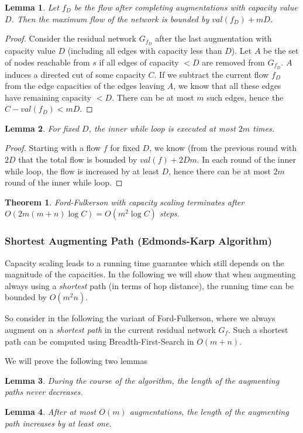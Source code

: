 \documentclass{article}
\newtheorem{lemma}{Lemma}
\newtheorem{theorem}{Theorem}
\begin{document}
\begin{lemma}
Let $f_D$ be the flow after completing augmentations with capacity value $D$. Then the maximum flow of the network is bounded by $val(f_D)+mD$.
\end{lemma}
\begin{proof}
Consider the residual network $G_{f_D}$ after the last augmentation with capacity value $D$ (including all edges with capacity less than $D$). Let $A$ be the set of nodes reachable from $s$ if all edges of capacity $<D$ are removed from $G_{f_D}$. $A$ induces a directed cut of some capacity $C$. If we subtract the current flow $f_D$ from the edge capacities of the edges leaving $A$, we know that all these edges have remaining capacity $<D$. There can be at most $m$ such edges, hence the $C-val(f_D)<mD$.
\end{proof}

\begin{lemma}
For fixed $D$, the inner while loop is executed at most $2m$ times.
\end{lemma}
\begin{proof}
Starting with a flow $f$ for fixed $D$, we know (from the previous round with $2D$ that the total flow is bounded by $val(f)+2Dm$. In each round of the inner while loop, the flow is increased by at least $D$, hence there can be at most $2m$ round of the inner while loop.
\end{proof}

\begin{theorem}
Ford-Fulkerson with capacity scaling terminates after $O(2m(m+n)\log C)=O(m^2\log C)$ steps.
\end{theorem}

\subsubsection{Shortest Augmenting Path (Edmonds-Karp Algorithm)}
Capacity scaling leads to a running time guarantee which still depends on the magnitude of the capacities.
In the following we will show that when augmenting always using a \emph{shortest} path (in terms of hop distance), the running time can be bounded by $O(m^2n)$.

So consider in the following the variant of Ford-Fulkerson, where we always augment on a \emph{shortest path} in the current residual network $G_f$. Such a shortest path can be computed using Breadth-First-Search in $O(m+n)$.

We will prove the following two lemmas 
\begin{lemma}\label{lem:SPnondec}
During the course of the algorithm, the length of the augmenting paths never decreases.
\end{lemma}
\begin{lemma}\label{lem:SPinc}
After at most $O(m)$ augmentations, the length of the augmenting path increases by at least one.
\end{lemma}
\end{document}
